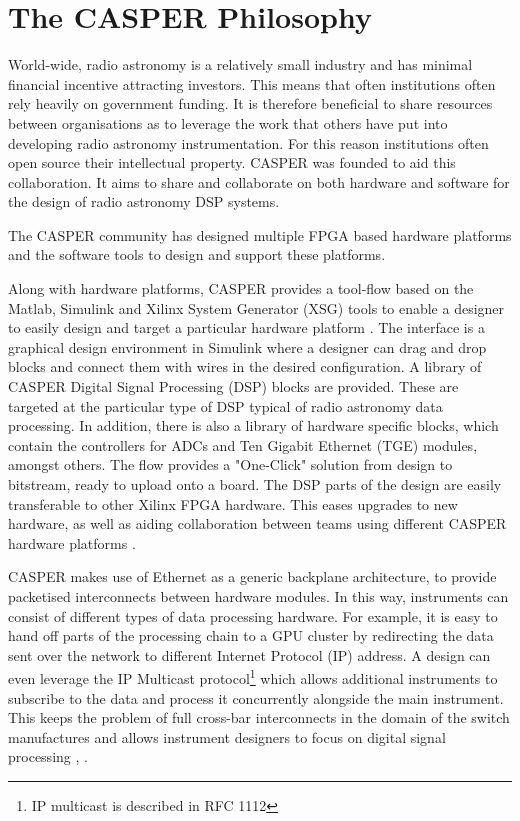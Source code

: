 \documentclass{ws-jai}
\begin{document}
\section{The CASPER Philosophy} \label{sec:CASPER-philosophy}



World-wide, radio astronomy is a relatively small industry and has minimal financial incentive attracting investors. This means that often institutions often rely heavily on government funding. It is therefore beneficial to share resources between organisations as to leverage the work that others have put into developing radio astronomy instrumentation. For this reason institutions often open source their intellectual property. CASPER was founded to aid this collaboration. It aims to share and collaborate on both hardware and software for the design of radio astronomy DSP systems.

The CASPER community has designed multiple FPGA based hardware platforms and the software tools to design and support these platforms.

Along with hardware platforms, CASPER provides a tool-flow based on the Matlab, Simulink and Xilinx System Generator (XSG) tools to enable a designer to easily design and target a particular hardware platform \cite{pars05}. The interface is a graphical design environment in Simulink where a designer can drag and drop blocks and connect them with wires in the desired configuration. A library of CASPER Digital Signal Processing (DSP) blocks are provided. These are targeted at the particular type of DSP typical of radio astronomy data processing. In addition, there is also a library of hardware specific blocks, which contain the controllers for ADCs and Ten Gigabit Ethernet (TGE) modules, amongst others. The flow provides a "One-Click" solution from design to bitstream, ready to upload onto a board. The DSP parts of the design are easily transferable to other Xilinx FPGA hardware. This eases upgrades to new hardware, as well as aiding collaboration between teams using different CASPER hardware platforms \cite{pars05}.

CASPER makes use of Ethernet as a generic backplane architecture, to provide packetised interconnects between hardware modules. In this way, instruments can consist of different types of data processing hardware. For example, it is easy to hand off parts of the processing chain to a GPU cluster by redirecting the data sent over the network to different Internet Protocol (IP) address. A design can even leverage the IP Multicast protocol\footnote{IP multicast is described in RFC 1112} which allows additional instruments to subscribe to the data and process it concurrently alongside the main instrument. This keeps the problem of full cross-bar interconnects in the domain of the switch manufactures and allows instrument designers to focus on digital signal processing \cite{man14}, \cite{pars05}.
\end{document}
